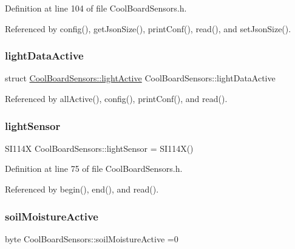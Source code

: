 Definition at line 104 of file Cool\+Board\+Sensors.\+h.



Referenced by config(), get\+Json\+Size(), print\+Conf(), read(), and set\+Json\+Size().

\mbox{\label{classCoolBoardSensors_ac4deb1cf41bac8b91c780c92fab00ba4}} 
\subsubsection{\texorpdfstring{light\+Data\+Active}{lightDataActive}}
{\footnotesize\ttfamily struct \hyperlink{structCoolBoardSensors_1_1lightActive}{Cool\+Board\+Sensors\+::light\+Active} Cool\+Board\+Sensors\+::light\+Data\+Active\hspace{0.3cm}{\ttfamily [private]}}



Referenced by all\+Active(), config(), print\+Conf(), and read().

\mbox{\label{classCoolBoardSensors_a3e397300fb707dd193e909a757bf6102}} 
\subsubsection{\texorpdfstring{light\+Sensor}{lightSensor}}
{\footnotesize\ttfamily S\+I114X Cool\+Board\+Sensors\+::light\+Sensor = S\+I114X()}



Definition at line 75 of file Cool\+Board\+Sensors.\+h.



Referenced by begin(), end(), and read().

\mbox{\label{classCoolBoardSensors_a31983eecc0f9cd000e1f912206ea4dc8}} 
\subsubsection{\texorpdfstring{soil\+Moisture\+Active}{soilMoistureActive}}
{\footnotesize\ttfamily byte Cool\+Board\+Sensors\+::soil\+Moisture\+Active =0\hspace{0.3cm}{\ttfamily [private]}}



